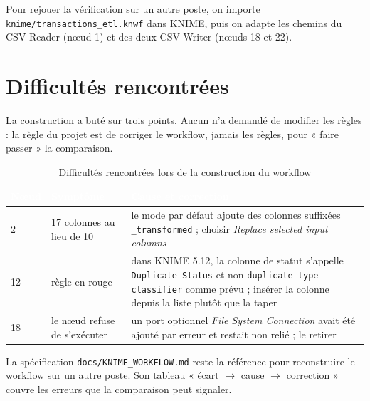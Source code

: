 Pour rejouer la vérification sur un autre poste, on importe \texttt{knime/transactions\_etl.knwf}
dans KNIME, puis on adapte les chemins du CSV Reader (nœud 1) et des deux CSV Writer (nœuds 18 et 22).

\section{Difficultés rencontrées}
La construction a buté sur trois points. Aucun n'a demandé de modifier les règles : la règle du
projet est de corriger le workflow, jamais les règles, pour « faire passer » la comparaison.

\begin{table}[H]
\centering\small
\caption{Difficultés rencontrées lors de la construction du workflow}
\label{tab:knime-difficultes}
\begin{tabularx}{\linewidth}{|l|X|X|}
\hline
\rowcolor{bluedark}\textcolor{white}{\textbf{Nœud}} & \textcolor{white}{\textbf{Symptôme}} & \textcolor{white}{\textbf{Cause et correction}} \\
\hline
2 & 17 colonnes au lieu de 10 & le mode par défaut ajoute des colonnes suffixées \texttt{\_transformed} ; choisir \emph{Replace selected input columns} \\
\hline
12 & règle en rouge & dans KNIME 5.12, la colonne de statut s'appelle \texttt{Duplicate Status} et non \texttt{duplicate-type-classifier} comme prévu ; insérer la colonne depuis la liste plutôt que la taper \\
\hline
18 & le nœud refuse de s'exécuter & un port optionnel \emph{File System Connection} avait été ajouté par erreur et restait non relié ; le retirer \\
\hline
\end{tabularx}
\end{table}

La spécification \texttt{docs/KNIME\_WORKFLOW.md} reste la référence pour reconstruire le workflow
sur un autre poste. Son tableau « écart $\rightarrow$ cause $\rightarrow$ correction » couvre les erreurs que la comparaison
peut signaler.
